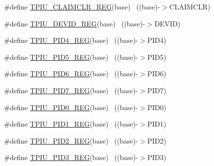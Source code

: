 \begin{DoxyCompactItemize}
\item 
\#define \hyperlink{group___t_p_i_u___register___accessor___macros_ga0e17510140274c78c7590de1b5d39c75}{T\+P\+I\+U\+\_\+\+C\+L\+A\+I\+M\+C\+L\+R\+\_\+\+R\+EG}(base)                                ~((base)-\/$>$C\+L\+A\+I\+M\+C\+LR)
\item 
\#define \hyperlink{group___t_p_i_u___register___accessor___macros_ga30d4f93f5e89c158bb79417caf4daa37}{T\+P\+I\+U\+\_\+\+D\+E\+V\+I\+D\+\_\+\+R\+EG}(base)                                      ~((base)-\/$>$D\+E\+V\+ID)
\item 
\#define \hyperlink{group___t_p_i_u___register___accessor___macros_ga2fb69dcf92ae17576611bbaef82a311b}{T\+P\+I\+U\+\_\+\+P\+I\+D4\+\_\+\+R\+EG}(base)                                        ~((base)-\/$>$P\+I\+D4)
\item 
\#define \hyperlink{group___t_p_i_u___register___accessor___macros_ga23bae8088e08814bfd85ca65917ef08d}{T\+P\+I\+U\+\_\+\+P\+I\+D5\+\_\+\+R\+EG}(base)                                        ~((base)-\/$>$P\+I\+D5)
\item 
\#define \hyperlink{group___t_p_i_u___register___accessor___macros_ga135cc7558ac7d8d2cce7535a7f2b2a0e}{T\+P\+I\+U\+\_\+\+P\+I\+D6\+\_\+\+R\+EG}(base)                                        ~((base)-\/$>$P\+I\+D6)
\item 
\#define \hyperlink{group___t_p_i_u___register___accessor___macros_ga4beab80bc710cd3ade8c413ed28052c2}{T\+P\+I\+U\+\_\+\+P\+I\+D7\+\_\+\+R\+EG}(base)                                        ~((base)-\/$>$P\+I\+D7)
\item 
\#define \hyperlink{group___t_p_i_u___register___accessor___macros_ga8e2ec990e5e23265bc0bb9a09ff6a164}{T\+P\+I\+U\+\_\+\+P\+I\+D0\+\_\+\+R\+EG}(base)                                        ~((base)-\/$>$P\+I\+D0)
\item 
\#define \hyperlink{group___t_p_i_u___register___accessor___macros_gafcbd8fadc083f6c8c9ae55edf780b9f8}{T\+P\+I\+U\+\_\+\+P\+I\+D1\+\_\+\+R\+EG}(base)                                        ~((base)-\/$>$P\+I\+D1)
\item 
\#define \hyperlink{group___t_p_i_u___register___accessor___macros_ga25559df859b61bb86a02cdc2004c6f30}{T\+P\+I\+U\+\_\+\+P\+I\+D2\+\_\+\+R\+EG}(base)                                        ~((base)-\/$>$P\+I\+D2)
\item 
\#define \hyperlink{group___t_p_i_u___register___accessor___macros_ga84d47dba808cfe2c3ce705e19b5fde1e}{T\+P\+I\+U\+\_\+\+P\+I\+D3\+\_\+\+R\+EG}(base)                                        ~((base)-\/$>$P\+I\+D3)

\end{DoxyCompactItemize}
